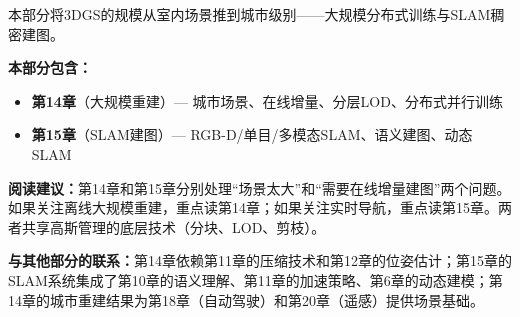 \vspace{1em}
\begin{center}
\textcolor{techgray}{\small 本部分将3DGS的规模从室内场景推到城市级别——大规模分布式训练与SLAM稠密建图。}
\end{center}
\vspace{0.5em}

\noindent\textbf{本部分包含：}
\begin{itemize}[leftmargin=2em,itemsep=1pt]
\item[\textcolor{techblue}{\textbullet}] \textbf{第14章}（大规模重建）— 城市场景、在线增量、分层LOD、分布式并行训练
\item[\textcolor{techblue}{\textbullet}] \textbf{第15章}（SLAM建图）— RGB-D/单目/多模态SLAM、语义建图、动态SLAM
\end{itemize}

\noindent\textbf{阅读建议：}第14章和第15章分别处理``场景太大''和``需要在线增量建图''两个问题。如果关注离线大规模重建，重点读第14章；如果关注实时导航，重点读第15章。两者共享高斯管理的底层技术（分块、LOD、剪枝）。

\noindent\textbf{与其他部分的联系：}第14章依赖第11章的压缩技术和第12章的位姿估计；第15章的SLAM系统集成了第10章的语义理解、第11章的加速策略、第6章的动态建模；第14章的城市重建结果为第18章（自动驾驶）和第20章（遥感）提供场景基础。

\vspace{1em}
